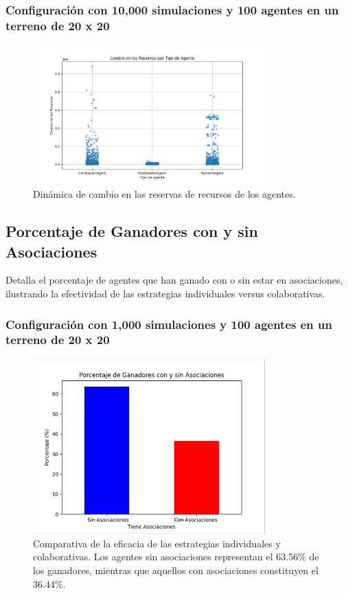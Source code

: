 \documentclass[11pt]{article}
\begin{document}
\subsubsection{Configuración con 10,000 simulaciones y 100 agentes en un terreno de 20 x 20}
\begin{figure}[H]
    \centering
    \includegraphics[width=0.8\textwidth]{images/reserves_change_num_simulations10000_size(20x20)_agents_count100.png}
    \caption{Dinámica de cambio en las reservas de recursos de los agentes.}
\end{figure}


\subsection{Porcentaje de Ganadores con y sin Asociaciones}

Detalla el porcentaje de agentes que han ganado con o sin estar en asociaciones, ilustrando la efectividad de las estrategias individuales versus colaborativas.
\subsubsection{Configuración con 1,000 simulaciones y 100 agentes en un terreno de 20 x 20}
\begin{figure}[H]
    \centering
    \includegraphics[width=0.8\textwidth]{images/Figure_5.png}
    \caption{Comparativa de la eficacia de las estrategias individuales y colaborativas. Los agentes sin asociaciones representan el 63.56\% de los ganadores, mientras que aquellos con asociaciones constituyen el 36.44\%.}

\end{figure}
\end{document}

